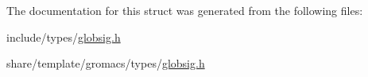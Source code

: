 \-The documentation for this struct was generated from the following files\-:\begin{DoxyCompactItemize}
\item 
include/types/\hyperlink{include_2types_2globsig_8h}{globsig.\-h}\item 
share/template/gromacs/types/\hyperlink{share_2template_2gromacs_2types_2globsig_8h}{globsig.\-h}\end{DoxyCompactItemize}
